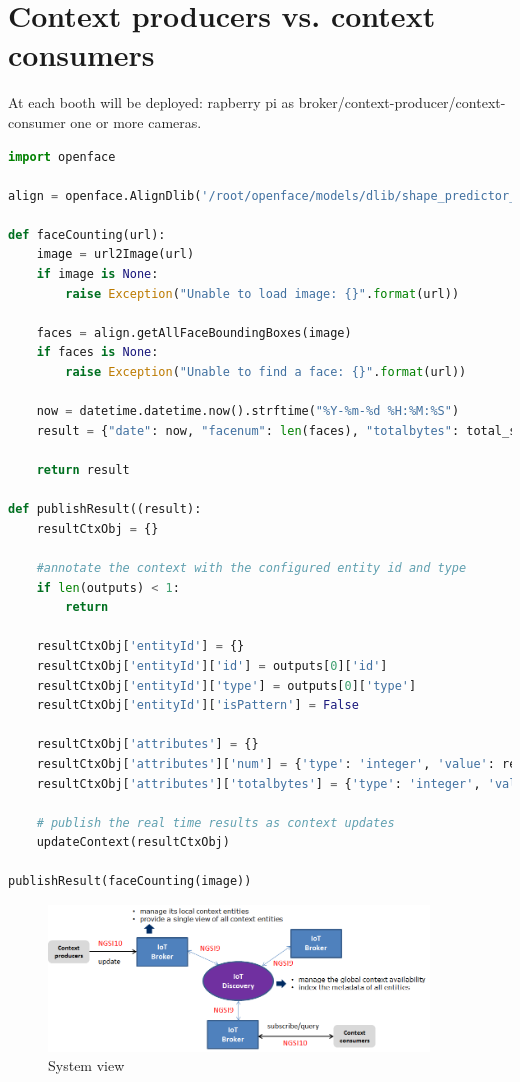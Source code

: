 \documentclass[conference]{ieeeconf}
\begin{document}
\section{Context producers vs. context consumers}
At each booth will be deployed:
rapberry pi as broker/context-producer/context-consumer
one or more cameras.

\begin{lstlisting}[language=Python]
import openface

align = openface.AlignDlib('/root/openface/models/dlib/shape_predictor_68_face_landmarks.dat')

def faceCounting(url):     
    image = url2Image(url)
    if image is None:
        raise Exception("Unable to load image: {}".format(url))
        
    faces = align.getAllFaceBoundingBoxes(image)
    if faces is None:
        raise Exception("Unable to find a face: {}".format(url))

    now = datetime.datetime.now().strftime("%Y-%m-%d %H:%M:%S")      
    result = {"date": now, "facenum": len(faces), "totalbytes": total_size}    

    return result
    
def publishResult((result):
    resultCtxObj = {}
        
    #annotate the context with the configured entity id and type
    if len(outputs) < 1:
        return   
    
    resultCtxObj['entityId'] = {}
    resultCtxObj['entityId']['id'] = outputs[0]['id']
    resultCtxObj['entityId']['type'] = outputs[0]['type']        
    resultCtxObj['entityId']['isPattern'] = False    
    
    resultCtxObj['attributes'] = {}
    resultCtxObj['attributes']['num'] = {'type': 'integer', 'value': result['facenum']}
    resultCtxObj['attributes']['totalbytes'] = {'type': 'integer', 'value': result['totalbytes']}    

    # publish the real time results as context updates    
    updateContext(resultCtxObj)
    
publishResult(faceCounting(image))
\end{lstlisting}

\begin{figure}[h]
    \centering
    \includegraphics[width=0.9\textwidth]{Images/distributed-brokers.png}
    \caption{System view}
\end{figure}{}
\end{document}
